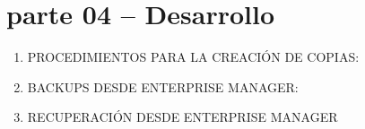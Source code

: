 \section{parte 04 – Desarrollo} 

\begin{enumerate}[1.]
	\item PROCEDIMIENTOS PARA LA CREACIÓN DE COPIAS:


	\item BACKUPS  DESDE  ENTERPRISE  MANAGER:
	

	\item RECUPERACIÓN  DESDE  ENTERPRISE  MANAGER
	

\end{enumerate} 
